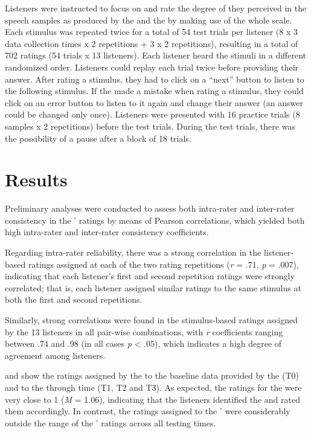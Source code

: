 \documentclass[output=paper]{langsci/langscibook}
\begin{document}
Listeners were instructed to focus on  and rate the degree of  they perceived in the speech samples as produced by the  and the  by making use of the whole scale. Each stimulus was repeated twice for a total of 54 test trials per listener (8  x 3 data collection times x 2 repetitions + 3  x 2 repetitions), resulting in a total of 702 ratings (54 trials x 13 listeners). Each listener heard the stimuli in a different randomized order. Listeners could replay each trial twice before providing their answer. After rating a stimulus, they had to click on a “next” button to listen to the following stimulus. If the  made a mistake when rating a stimulus, they could click on an error button to listen to it again and change their answer (an answer could be changed only once). Listeners were presented with 16 practice trials (8 samples x 2 repetitions) before the test trials. During the test trials, there was the possibility of a pause after a block of 18 trials.


\section{Results}

Preliminary analyses were conducted to assess both intra-rater and inter-rater consistency in the ’ ratings by means of Pearson correlations, which yielded both high intra-rater and inter-rater consistency coefficients. 

Regarding intra-rater reliability, there was a strong correlation in the listener-based  ratings assigned at each of the two rating repetitions (\textit{r} = .71, \textit{p} = .007), indicating that each listener’s first and second repetition ratings were strongly correlated; that is, each listener assigned similar ratings to the same stimulus at both the first and second repetitions.

Similarly, strong correlations were found in the stimulus-based  ratings assigned by the 13 listeners in all pair-wise combinations, with \textit{r} coefficients ranging between .74 and .98 (in all cases \textit{p} < .05), which indicates a high degree of agreement among listeners.

 and  show the  ratings assigned by the  to the baseline data provided by the  (T0) and to the  through time (T1, T2 and T3). As expected, the ratings for the  were very close to 1 (\textit{M} = 1.06), indicating that the listeners identified the   and rated them accordingly. In contrast, the ratings assigned to the ’ were considerably outside the range of the ’ ratings across all testing times. 
\end{document}
